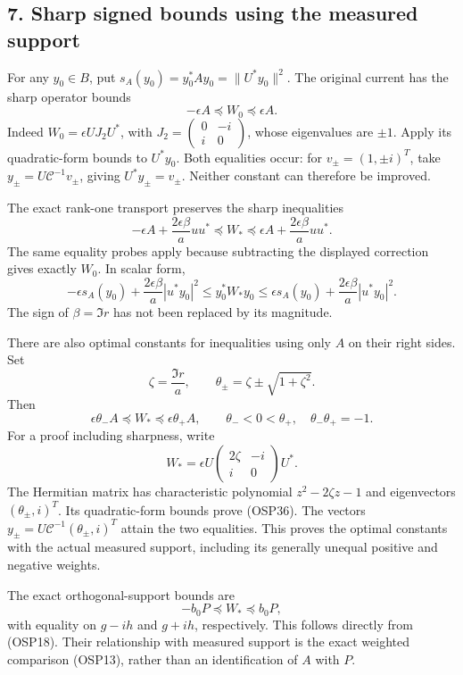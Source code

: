 \documentclass[
]{article}
\begin{document}
\subsection{7. Sharp signed bounds using the measured
support}\label{sharp-signed-bounds-using-the-measured-support}

For any \(y_0\in B\), put \(s_A(y_0)=y_0^*Ay_0=\|U^*y_0\|^2\). The
original current has the sharp operator bounds \[
-\epsilon A\preceq W_0\preceq\epsilon A.
\tag{OSP33}
\] Indeed \(W_0=\epsilon UJ_2U^*\), with
\(J_2=\left(\begin{smallmatrix}0&-i\\i&0\end{smallmatrix}\right)\),
whose eigenvalues are \(\pm1\). Apply its quadratic-form bounds to
\(U^*y_0\). Both equalities occur: for \(v_\pm=(1,\pm i)^T\), take
\(y_\pm=U\mathcal C^{-1}v_\pm\), giving \(U^*y_\pm=v_\pm\). Neither
constant can therefore be improved.

The exact rank-one transport preserves the sharp inequalities \[
-\epsilon A+\frac{2\epsilon\beta}{a}uu^*
\preceq W_*\preceq
\epsilon A+\frac{2\epsilon\beta}{a}uu^*.
\tag{OSP34}
\] The same equality probes apply because subtracting the displayed
correction gives exactly \(W_0\). In scalar form, \[
-\epsilon s_A(y_0)+\frac{2\epsilon\beta}{a}|u^*y_0|^2
\le y_0^*W_*y_0\le
\epsilon s_A(y_0)+\frac{2\epsilon\beta}{a}|u^*y_0|^2.
\tag{OSP35}
\] The sign of \(\beta=\Im r\) has not been replaced by its magnitude.

There are also optimal constants for inequalities using only \(A\) on
their right sides. Set \[
\zeta=\frac{\Im r}{a},\qquad
\theta_\pm=\zeta\pm\sqrt{1+\zeta^2}.
\] Then \[
\epsilon\theta_- A\preceq W_*\preceq\epsilon\theta_+ A,
\qquad\theta_-<0<\theta_+,\quad\theta_-\theta_+=-1.
\tag{OSP36}
\] For a proof including sharpness, write \[
W_*=\epsilon U\begin{pmatrix}2\zeta&-i\\i&0\end{pmatrix}U^*.
\] The Hermitian matrix has characteristic polynomial \(z^2-2\zeta z-1\)
and eigenvectors \((\theta_\pm,i)^T\). Its quadratic-form bounds prove
(OSP36). The vectors \(y_\pm=U\mathcal C^{-1}(\theta_\pm,i)^T\) attain
the two equalities. This proves the optimal constants with the actual
measured support, including its generally unequal positive and negative
weights.

The exact orthogonal-support bounds are \[
-b_0P\preceq W_*\preceq b_0P,
\tag{OSP37}
\] with equality on \(g-ih\) and \(g+ih\), respectively. This follows
directly from (OSP18). Their relationship with measured support is the
exact weighted comparison (OSP13), rather than an identification of
\(A\) with \(P\).
\end{document}
